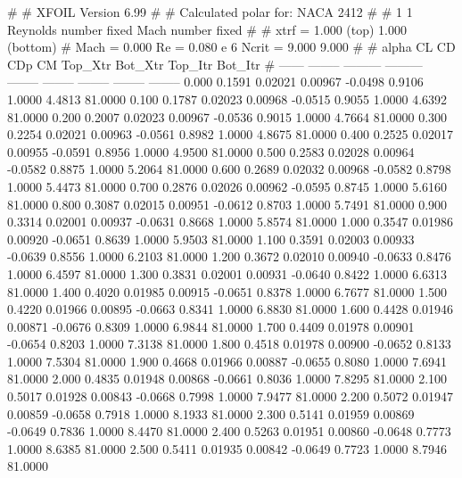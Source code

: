 #  
#       XFOIL         Version 6.99
#  
# Calculated polar for: NACA 2412                                       
#  
# 1 1 Reynolds number fixed          Mach number fixed         
#  
# xtrf =   1.000 (top)        1.000 (bottom)  
# Mach =   0.000     Re =     0.080 e 6     Ncrit =   9.000  9.000
#  
#   alpha    CL        CD       CDp       CM     Top_Xtr  Bot_Xtr  Top_Itr  Bot_Itr
#  ------ -------- --------- --------- -------- -------- -------- -------- --------
   0.000   0.1591   0.02021   0.00967  -0.0498   0.9106   1.0000   4.4813  81.0000
   0.100   0.1787   0.02023   0.00968  -0.0515   0.9055   1.0000   4.6392  81.0000
   0.200   0.2007   0.02023   0.00967  -0.0536   0.9015   1.0000   4.7664  81.0000
   0.300   0.2254   0.02021   0.00963  -0.0561   0.8982   1.0000   4.8675  81.0000
   0.400   0.2525   0.02017   0.00955  -0.0591   0.8956   1.0000   4.9500  81.0000
   0.500   0.2583   0.02028   0.00964  -0.0582   0.8875   1.0000   5.2064  81.0000
   0.600   0.2689   0.02032   0.00968  -0.0582   0.8798   1.0000   5.4473  81.0000
   0.700   0.2876   0.02026   0.00962  -0.0595   0.8745   1.0000   5.6160  81.0000
   0.800   0.3087   0.02015   0.00951  -0.0612   0.8703   1.0000   5.7491  81.0000
   0.900   0.3314   0.02001   0.00937  -0.0631   0.8668   1.0000   5.8574  81.0000
   1.000   0.3547   0.01986   0.00920  -0.0651   0.8639   1.0000   5.9503  81.0000
   1.100   0.3591   0.02003   0.00933  -0.0639   0.8556   1.0000   6.2103  81.0000
   1.200   0.3672   0.02010   0.00940  -0.0633   0.8476   1.0000   6.4597  81.0000
   1.300   0.3831   0.02001   0.00931  -0.0640   0.8422   1.0000   6.6313  81.0000
   1.400   0.4020   0.01985   0.00915  -0.0651   0.8378   1.0000   6.7677  81.0000
   1.500   0.4220   0.01966   0.00895  -0.0663   0.8341   1.0000   6.8830  81.0000
   1.600   0.4428   0.01946   0.00871  -0.0676   0.8309   1.0000   6.9844  81.0000
   1.700   0.4409   0.01978   0.00901  -0.0654   0.8203   1.0000   7.3138  81.0000
   1.800   0.4518   0.01978   0.00900  -0.0652   0.8133   1.0000   7.5304  81.0000
   1.900   0.4668   0.01966   0.00887  -0.0655   0.8080   1.0000   7.6941  81.0000
   2.000   0.4835   0.01948   0.00868  -0.0661   0.8036   1.0000   7.8295  81.0000
   2.100   0.5017   0.01928   0.00843  -0.0668   0.7998   1.0000   7.9477  81.0000
   2.200   0.5072   0.01947   0.00859  -0.0658   0.7918   1.0000   8.1933  81.0000
   2.300   0.5141   0.01959   0.00869  -0.0649   0.7836   1.0000   8.4470  81.0000
   2.400   0.5263   0.01951   0.00860  -0.0648   0.7773   1.0000   8.6385  81.0000
   2.500   0.5411   0.01935   0.00842  -0.0649   0.7723   1.0000   8.7946  81.0000
